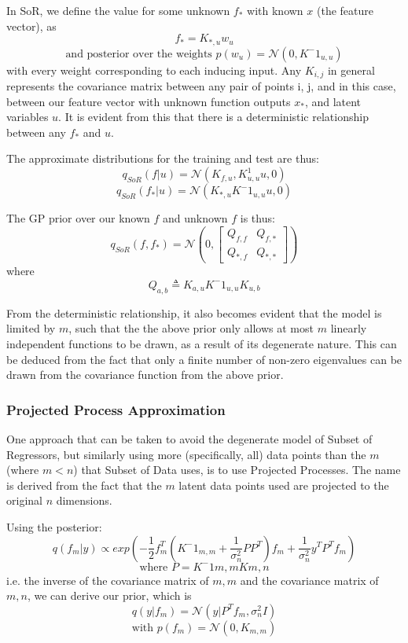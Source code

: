 \documentclass[10pt,sts]{article}
\begin{document}
\begin{multicols}{2}
    In SoR, we define the value for some unknown $f_*$ with known $x$ (the feature vector), as $$f_* = K_{*,u}w_u$$ $$\textrm{and posterior over the weights } p(w_u) = \mathcal{N}(0, K^-1_{u,u})$$ with every weight corresponding to each inducing input. Any $K_{i, j}$ in general represents the covariance matrix between any pair of points i, j, and in this case, between our feature vector with unknown function outputs $x_*$, and latent variables $u$. It is evident from this that there is a deterministic relationship between any $f_*$ and $u$.

    The approximate distributions for the training and test are thus:
    $$q_{SoR}(f|u) = \mathcal{N}(K_{f,u},K^1_{u,u}u, 0)$$
    $$q_{SoR}(f_*|u) = \mathcal{N}(K_{*,u}K^-1_{u,u}u, 0)$$

    The GP prior over our known $f$ and unknown $f$ is thus:
    $$q_{SoR}(f, f_*) = \mathcal{N}(0, \left[
    \begin{matrix}
        Q_{f,f} & Q_{f,*} \\
        Q_{*,f} & Q_{*,*}
    \end{matrix}\right])
    $$
    where $$Q_{a,b} \triangleq K_{a,u}K^-1_{u,u}K_{u,b} $$

    From the deterministic relationship, it also becomes evident that the model is limited by $m$, such that the the above prior only allows at most $m$ linearly independent functions to be drawn, as a result of its degenerate nature. This can be deduced from the fact that only a finite number of non-zero eigenvalues can be drawn from the covariance function from the above prior.

    \subsubsection{Projected Process Approximation} 

    One approach that can be taken to avoid the degenerate model of Subset of Regressors, but similarly using more (specifically, all) data points than the $m$ (where $m < n$) that Subset of Data uses, is to use Projected Processes. The name is derived from the fact that the $m$ latent data points used are projected to the original $n$ dimensions.

    Using the posterior:
    $$ q(f_m | y) \propto exp\left( -\frac{1}{2}f^T_m(K^-1_{m,m} + \frac{1}{\sigma^2_n}PP^T)f_m + \frac{1}{\sigma^2_n}y^TP^Tf_m  \right)$$
    $$ \textrm{where } P = K^-1{m,m}K{m,n} $$
    i.e. the inverse of the covariance matrix of $m, m$ and the covariance matrix of $m, n$, we can derive our prior, which is
    $$ q(y|f_m) = \mathcal{N}(y|P^Tf_m,\sigma^2_nI) $$
    $$ \textrm{with } p(f_m) = \mathcal{N}(0, K_{m,m})$$


\end{multicols}
\end{document}
